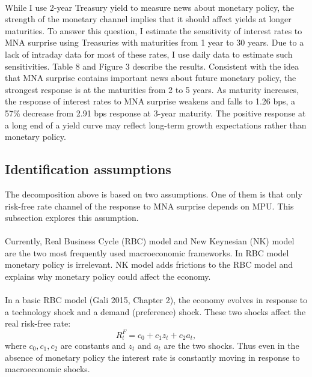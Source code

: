 \documentclass[12pt]{article}
\begin{document}
\paragraph{}
While I use 2-year Treasury yield to measure news about monetary policy, the strength of the monetary channel implies that it should affect yields at longer maturities. To answer this question, I estimate the sensitivity of interest rates to MNA surprise using Treasuries with maturities from 1 year to 30 years. Due to a lack of intraday data for most of these rates, I use daily data to estimate such sensitivities. Table 8 and Figure 3 describe the results. Consistent with the idea that MNA surprise contains important news about future monetary policy, the strongest response is at the maturities from 2 to 5 years. As maturity increases, the response of interest rates to MNA surprise weakens and falls to 1.26 bps, a 57\% decrease from 2.91 bps response at 3-year maturity. The positive response at a long end of a yield curve may reflect long-term growth expectations rather than monetary policy. 


\subsection{Identification assumptions} 
\label{sec:Model}

The decomposition above is based on two assumptions. One of them is that only risk-free rate channel of the response to MNA surprise depends on MPU. This subsection explores this assumption.
\paragraph{}
Currently, Real Business Cycle (RBC) model and New Keynesian (NK) model are the two most frequently used macroeconomic frameworks. In RBC model monetary policy is irrelevant. NK model adds frictions to the RBC model and explains why monetary policy could affect the economy. 
\paragraph{}
In a basic RBC model (Gali 2015, Chapter 2), the economy evolves in response to a technology shock and a demand (preference) shock. These two shocks affect the real risk-free rate:
\begin{equation}
    R^F_t = c_0 + c_1 z_t + c_2 a_t,
\end{equation}
where $c_0, c_1, c_2$ are constants and $z_t$ and $a_t$ are the two shocks. Thus even in the absence of monetary policy the interest rate is constantly moving in response to macroeconomic shocks. 
\end{document}
